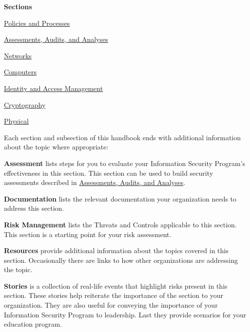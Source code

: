 \textbf{Sections}
\begin{description}
\item \hyperref[sec:"Policies and Processes"]{Policies and Processes}
\item \hyperref[sec:"Assessments, Audits, and Analyses"]{Assessments, Audits, and Analyses}
\item \hyperref[sec:"Networks"]{Networks}
\item \hyperref[sec:"Computers"]{Computers}
\item \hyperref[sec:"Identity and Access Management"]{Identity and Access Management}
\item \hyperref[sec:"Cryptography"]{Cryptography}
\item \hyperref[sec:"Physical"]{Physical}
\end{description}\vspace{5mm}
Each section and subsection of this handbook ends with additional information about the topic where appropriate:
\begin{description}
\item\textbf{Assessment} lists steps for you to evaluate your Information Security Program's effectiveness in this section. This section can be used to build security assessments described in \hyperref[sec:"Assessments, Audits, and Analyses"]{Assessments, Audits, and Analyses}.
\item\textbf{Documentation} lists the relevant documentation your organization needs to address this section. 
\item\textbf{Risk Management} lists the Threats and Controls applicable to this section. This section is a starting point for your risk assessment. 
\item\textbf{Resources} provide additional information about the topics covered in this section. Occasionally there are links to how other organizations are addressing the topic.
\item\textbf{Stories} is a collection of real-life events that highlight risks present in this section. These stories help reiterate the importance of the section to your organization. They are also useful for conveying the importance of your Information Security Program to leadership. Last they provide scenarios for your education program. 
\end{description}